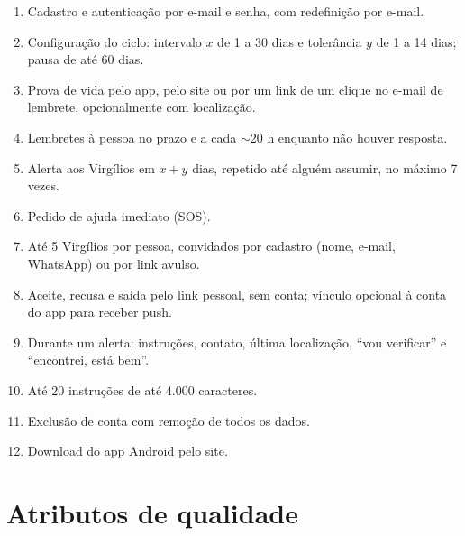 \documentclass[11pt,a4paper]{report}
\begin{document}
\begin{enumerate}
  \item Cadastro e autenticação por e-mail e senha, com redefinição por e-mail.
  \item Configuração do ciclo: intervalo $x$ de 1 a 30 dias e tolerância $y$ de 1 a 14 dias; pausa de até 60 dias.
  \item Prova de vida pelo app, pelo site ou por um link de um clique no e-mail de lembrete, opcionalmente com localização.
  \item Lembretes à pessoa no prazo e a cada $\sim$20 h enquanto não houver resposta.
  \item Alerta aos Virgílios em $x+y$ dias, repetido até alguém assumir, no máximo 7 vezes.
  \item Pedido de ajuda imediato (SOS).
  \item Até 5 Virgílios por pessoa, convidados por cadastro (nome, e-mail, WhatsApp) ou por link avulso.
  \item Aceite, recusa e saída pelo link pessoal, sem conta; vínculo opcional à conta do app para receber push.
  \item Durante um alerta: instruções, contato, última localização, ``vou verificar'' e ``encontrei, está bem''.
  \item Até 20 instruções de até 4.000 caracteres.
  \item Exclusão de conta com remoção de todos os dados.
  \item Download do app Android pelo site.
\end{enumerate}

\section{Atributos de qualidade}
\end{document}
